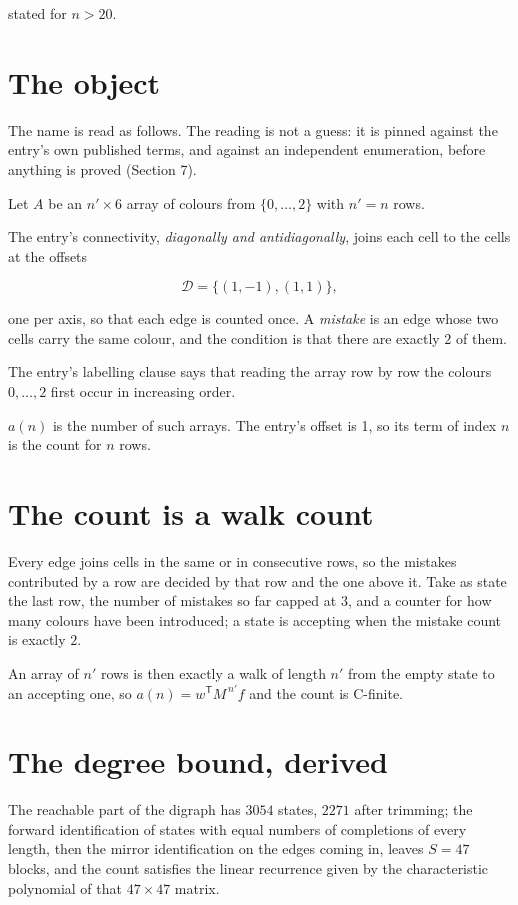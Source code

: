 \documentclass[11pt]{article}
\theoremstyle{definition}
\begin{document}
stated for $n > 20$.

\section{The object}

The name is read as follows. The reading is not a guess: it is pinned against the entry's own published terms, and against an independent enumeration, before anything is proved (Section 7).

Let $A$ be an $n' \times 6$ array of colours from $\{0,\dots,2\}$ with $n' = n$ rows.

The entry's connectivity, {\itshape diagonally and antidiagonally}, joins each cell to the cells at the offsets

\[\mathcal{D} = \{(1,-1), (1,1)\},\]

one per axis, so that each edge is counted once. A {\itshape mistake} is an edge whose two cells carry the same colour, and the condition is that there are exactly $2$ of them.

The entry's labelling clause says that reading the array row by row the colours $0,\dots,2$ first occur in increasing order.

$a(n)$ is the number of such arrays. The entry's offset is 1, so its term of index $n$ is the count for $n$ rows.

\section{The count is a walk count}

Every edge joins cells in the same or in consecutive rows, so the mistakes contributed by a row are decided by that row and the one above it. Take as state the last row, the number of mistakes so far capped at $3$, and a counter for how many colours have been introduced; a state is accepting when the mistake count is exactly $2$.

An array of $n'$ rows is then exactly a walk of length $n'$ from the empty state to an accepting one, so $a(n) = w^{\mathsf T}M^{\,n'}f$ and the count is C-finite.

\section{The degree bound, derived}

The reachable part of the digraph has $3054$ states, $2271$ after trimming; the forward identification of states with equal numbers of completions of every length, then the mirror identification on the edges coming in, leaves $S = 47$ blocks, and the count satisfies the linear recurrence given by the characteristic polynomial of that $47\times47$ matrix.
\end{document}
